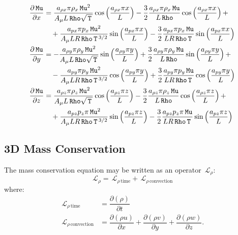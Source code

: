 \documentclass[10pt]{article}
\newcommand{\Diff}[2] {\dfrac{\partial( #1)}{\partial #2}}
\newcommand{\diff}[2] {\dfrac{\partial #1}{\partial #2}}
\newcommand{\Rho}{\,\mathtt{Rho}}
\newcommand{\Lo}{\,\mathcal{L}}
\newcommand{\Mu}{\,\mathtt{Mu}}
\newcommand{\T}{\,\mathtt{T}\,}
\newcommand{\DMuDx}{\diff{\Mu}{x}}
\newcommand{\DMuDy}{\diff{\Mu}{y}}
\newcommand{\DMuDz}{\diff{\Mu}{z}}
\begin{document}
\begin{equation}
\begin{split}\label{eq:aux_02}
\DMuDx &= \dfrac{a_{\rho x} \pi \rho_x \Mu^2 }{A_{\mu} L \Rho \sqrt{\T}}\cos\left(\dfrac{a_{\rho x} \pi x}{L}\right)-\dfrac{3}{2} \dfrac{a_{\rho x} \pi \rho_x \Mu }{L \Rho}\cos\left(\dfrac{a_{\rho x} \pi x}{L}\right) + \\ 
&\quad+\dfrac{a_{px} \pi p_x \Mu^2 }{A_{\mu} L R \Rho \T^{3/2}}\sin\left(\dfrac{a_{px} \pi x}{L}\right)-\dfrac{3}{2} \dfrac{a_{px} \pi p_x \Mu }{L R \Rho \T}\sin\left(\dfrac{a_{px} \pi x}{L}\right)\\ \vspace{15pt}
%
\DMuDy &= -\dfrac{a_{\rho y} \pi \rho_y \Mu^2 }{A_{\mu} L \Rho \sqrt{\T}}\sin\left(\dfrac{a_{\rho y} \pi y}{L}\right)+\dfrac{3}{2} \dfrac{a_{\rho y} \pi \rho_y \Mu }{L \Rho}\sin\left(\dfrac{a_{\rho y} \pi y}{L}\right) + \\ 
&\quad-\dfrac{a_{py} \pi p_y \Mu^2 }{A_{\mu} L R \Rho \T^{3/2}}\cos\left(\dfrac{a_{py} \pi y}{L}\right)+\dfrac{3}{2} \dfrac{a_{py} \pi p_y \Mu }{L R \Rho \T}\cos\left(\dfrac{a_{py} \pi y}{L}\right) \\ \vspace{15pt}
%
\DMuDz &= \dfrac{a_{\rho z} \pi \rho_z \Mu^2 }{A_{\mu} L \Rho \sqrt{\T}}\cos\left(\dfrac{a_{\rho z} \pi z}{L}\right)-\dfrac{3}{2} \dfrac{a_{\rho z} \pi \rho_z \Mu }{L \Rho}\cos\left(\dfrac{a_{\rho z} \pi z}{L}\right) + \\ 
&\quad+\dfrac{a_{pz} p_z \pi \Mu^2 }{A_{\mu} L R \Rho \T^{3/2}}\sin\left(\dfrac{a_{pz} \pi z}{L}\right)-\dfrac{3}{2} \dfrac{a_{pz} p_z \pi \Mu }{L R \Rho \T}\sin\left(\dfrac{a_{pz} \pi z}{L}\right)
\end{split}
\end{equation}

\subsection{3D Mass Conservation}
The mass conservation equation may be written as an operator $\Lo_\rho$:
$$ \Lo_{\rho} = \Lo_{\rho \, \text{time}}+\Lo_{\rho \, \text{convection}}$$
where:
\begin{equation}
\begin{split}\label{eq:rho_operators}
\Lo_{\rho \, \text{time}}&=\Diff{\rho}{t} \\
\Lo_{\rho \, \text{convection}}&=\Diff{\rho u}{x}+\Diff{\rho v}{y} + \Diff{\rho w}{z}.
\end{split}
 \end{equation}
\end{document}
